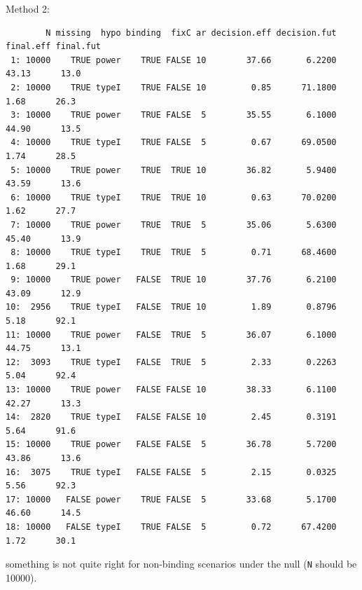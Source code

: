 \documentclass[12pt]{article}
\newcommand\Warning[1][3ex]{%
\renewcommand\stacktype{L}%
\scaleto{\stackon[1.3pt]{\color{red}$\triangle$}{\tiny\bfseries !}}{#1}%
\xspace
}
\begin{document}
Method 2:
\begin{verbatim}
        N missing  hypo binding  fixC ar decision.eff decision.fut final.eff final.fut
 1: 10000    TRUE power    TRUE FALSE 10        37.66       6.2200     43.13      13.0
 2: 10000    TRUE typeI    TRUE FALSE 10         0.85      71.1800      1.68      26.3
 3: 10000    TRUE power    TRUE FALSE  5        35.55       6.1000     44.90      13.5
 4: 10000    TRUE typeI    TRUE FALSE  5         0.67      69.0500      1.74      28.5
 5: 10000    TRUE power    TRUE  TRUE 10        36.82       5.9400     43.59      13.6
 6: 10000    TRUE typeI    TRUE  TRUE 10         0.63      70.0200      1.62      27.7
 7: 10000    TRUE power    TRUE  TRUE  5        35.06       5.6300     45.40      13.9
 8: 10000    TRUE typeI    TRUE  TRUE  5         0.71      68.4600      1.68      29.1
 9: 10000    TRUE power   FALSE  TRUE 10        37.76       6.2100     43.09      12.9
10:  2956    TRUE typeI   FALSE  TRUE 10         1.89       0.8796      5.18      92.1
11: 10000    TRUE power   FALSE  TRUE  5        36.07       6.1000     44.75      13.1
12:  3093    TRUE typeI   FALSE  TRUE  5         2.33       0.2263      5.04      92.4
13: 10000    TRUE power   FALSE FALSE 10        38.33       6.1100     42.27      13.3
14:  2820    TRUE typeI   FALSE FALSE 10         2.45       0.3191      5.64      91.6
15: 10000    TRUE power   FALSE FALSE  5        36.78       5.7200     43.86      13.6
16:  3075    TRUE typeI   FALSE FALSE  5         2.15       0.0325      5.56      92.3
17: 10000   FALSE power    TRUE FALSE  5        33.68       5.1700     46.60      14.5
18: 10000   FALSE typeI    TRUE FALSE  5         0.72      67.4200      1.72      30.1
\end{verbatim}
\Warning something is not quite right for non-binding scenarios under the null (\texttt{N} should be 10000).

\clearpage
\end{document}
